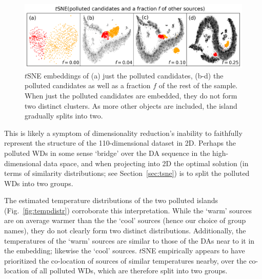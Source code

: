 \documentclass[fleqn,usenatbib]{rasti}
\begin{document}
\begin{figure}
\centering
\includegraphics[width=\textwidth]{figures/fig8_whytwoislands.png}
\caption{
    $t$SNE embeddings of (a) just the polluted candidates, (b-d) the polluted candidates as well as a fraction $f$ of the rest of the sample.
    When just the polluted candidates are embedded, they do not form two distinct clusters.
    As more other objects are included, the island gradually splits into two.
}
\label{fig:whytwoislands}
\end{figure}

This is likely a symptom of dimensionality reduction's inability to faithfully represent the structure of the 110-dimensional dataset in 2D.
Perhaps the polluted WDs in some sense `bridge' over the DA sequence in the high-dimensional data space, and when projecting into 2D the optimal solution (in terms of similarity distributions; see Section~\ref{sec:tsne}) is to split the polluted WDs into two groups.

The estimated temperature distributions of the two polluted islands (Fig.~\ref{fig:tempdistr}) corroborate this interpretation.
While the `warm' sources are on average warmer than the the `cool' sources (hence our choice of group names), they do not clearly form two distinct distributions.
Additionally, the temperatures of the `warm' sources are similar to those of the DAs near to it in the embedding; likewise the `cool' sources.
$t$SNE empirically appears to have prioritized the co-location of sources of similar temperatures nearby, over the co-location of all polluted WDs, which are therefore split into two groups.
\end{document}
